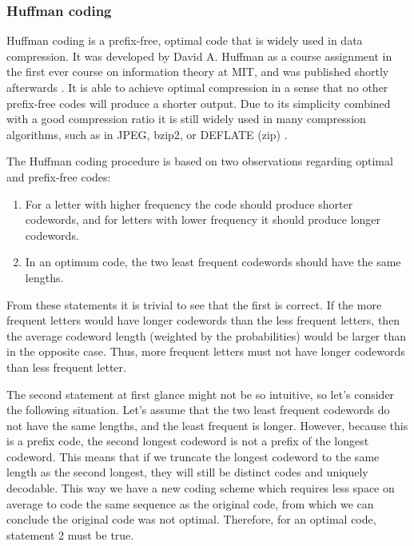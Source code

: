   

      \subsubsection{Huffman coding}

      Huffman coding is a prefix-free, optimal code that is widely used in data compression. It was developed by David A. Huffman as a course assignment in the first ever course on information theory at MIT, and was published shortly afterwards \cite{huffman_method_1952}. It is able to achieve optimal compression in a sense that no other prefix-free codes will produce a shorter output. Due to its simplicity combined with a good compression ratio it is still widely used in many compression algorithms, such as in JPEG, bzip2, or DEFLATE (zip) \cite{salomon_handbook_2010}.
      
  
      The Huffman coding procedure is based on two observations regarding optimal and prefix-free codes:
      \begin{enumerate}
        \item For a letter with higher frequency the code should produce shorter codewords, and for letters with lower frequency it should produce longer codewords.
        \item In an optimum code, the two least frequent codewords should have the same lengths.
      \end{enumerate}
  
      From these statements it is trivial to see that the first is correct. If the more frequent letters would have longer codewords than the less frequent letters, then the average codeword length (weighted by the probabilities) would be larger than in the opposite case. Thus, more frequent letters must not have longer codewords than less frequent letter.
  
      The second statement at first glance might not be so intuitive, so let's consider the following situation. Let's assume that the two least frequent codewords do not have the same lengths, and the least frequent is longer. However, because this is a prefix code, the second longest codeword is not a prefix of the longest codeword. This means that if we truncate the longest codeword to the same length as the second longest, they will still be distinct codes and uniquely decodable. This way we have a new coding scheme which requires less space on average to code the same sequence as the original code, from which we can conclude the original code was not optimal. Therefore, for an optimal code, statement 2 must be true.
  
